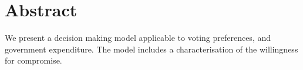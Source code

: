 \documentclass[
10pt, %
a4paper, %
oneside, %
headinclude,footinclude, %
BCOR5mm, %
]{scrartcl}
\title{\normalfont\spacedallcaps{Expenditure Model Abstract}} %
\author{\spacedlowsmallcaps{Caleb Moses\textsuperscript{1}}} %
\date{\today} %
\theoremstyle{definition} %
\theoremstyle{plain} %
\theoremstyle{remark} %
\begin{document}

\renewcommand{\sectionmark}[1]{\markright{\spacedlowsmallcaps{#1}}} %
\lehead{\mbox{\llap{\small\thepage\kern1em\color{halfgray} \vline}\color{halfgray}\hspace{0.5em}\rightmark\hfil}} %

\pagestyle{scrheadings} %


\maketitle %

\setcounter{tocdepth}{2} %

\tableofcontents %

\listoffigures %

\listoftables %


\section*{Abstract} %

We present a decision making model applicable to voting preferences, and government expenditure. The model includes a characterisation of the willingness for compromise.
\end{document}
